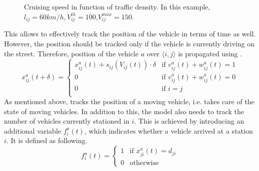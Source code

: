\begin{figure}[t]
	\centering
	\caption[Cruising speed in function of traffic density]{Cruising speed in function of traffic density. In this example, $l_{ij} = 60 km/h,V_{ij}^{th} = 100$,$V_{ij}^{max} = 150$.  }
	\label{fig:speed_model}
\end{figure}
This allows to effectively track the position of the vehicle in terms of time as well. However, the position should be tracked only if the vehicle is currently driving on the street. 
Therefore, position of the vehicle $a$ over $\langle i,j\rangle$ is propagated using . 
\begin{equation}
	x^a_{ij}(t+\delta) =\begin{cases}
		 x^a_{ij}(t) + s_{ij}(V_{ij}(t))\cdot\delta & \text{if } v^a_{ij}(t) + w^a_{ij}(t)= 1 \\
		 
		 0& \text{if } v^a_{ij}(t) + w^a_{ij}(t)= 0\\
		 0& \text{if }i=j \\
	\end{cases}
	 \label{eq:position_propagation}
\end{equation}
As mentioned above,  tracks the position of a moving vehicle, i.e. takes care of the state of moving vehicles. In addition to this, the model also needs to track the number of vehicles currently stationed in $i$. This is achieved by introducing an additional variable $f^a_i(t)$, which indicates whether a vehicle arrived at a station $i$. It is defined as following.
\begin{equation}
	f^a_{i}(t) =\begin{cases}
		1 & \text{if }x^a_{ji}(t)= d_{ji}\\
		0 & \text{otherwise}
	\end{cases}
	\label{eq:station_propagation}
\end{equation}
